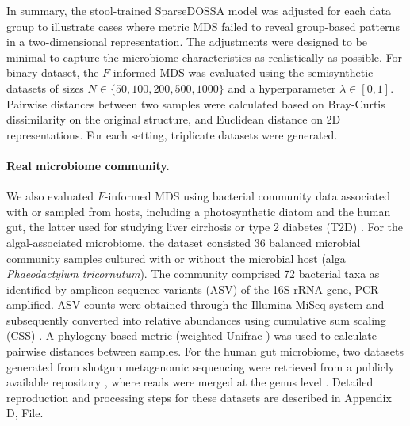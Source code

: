 \documentclass[10pt,letterpaper]{article}
\newcommand{\1}{{\rm 1}\kern-0.24em{\rm I}}
\begin{document}
In summary, the stool-trained SparseDOSSA model was adjusted for each data group to illustrate cases where metric MDS failed to reveal group-based patterns in a two-dimensional representation. The adjustments were designed to be minimal to capture the microbiome characteristics as realistically as possible. For binary dataset, the $F$-informed MDS was evaluated using the semisynthetic datasets of sizes $N\in\{50,100,200,500,1000\}$ and a hyperparameter $\lambda\in[0, 1]$. Pairwise distances between two samples were calculated based on Bray-Curtis dissimilarity on the original structure, and Euclidean distance on 2D representations. For each setting, triplicate datasets were generated.

\paragraph*{Real microbiome community.}
We also evaluated $F$-informed MDS using bacterial community data associated with or sampled from hosts, including a photosynthetic diatom \cite{kim22} and the human gut, the latter used for studying liver cirrhosis \cite{Qin14} or type 2 diabetes (T2D) \cite{Karlsson13, Qin12}. 
For the algal-associated microbiome, the dataset consisted 36 balanced microbial community samples cultured with or without the microbial host (alga \textit{Phaeodactylum tricornutum}). The community comprised 72 bacterial taxa as identified by amplicon sequence variants (ASV) of the 16S rRNA gene, PCR-amplified. ASV counts were obtained through the Illumina MiSeq system and subsequently converted into relative abundances using cumulative sum scaling (CSS) \cite{paulson13}. A phylogeny-based metric (weighted Unifrac \cite{lozupone07}) was used to calculate pairwise distances between samples.
For the human gut microbiome, two datasets generated from shotgun metagenomic sequencing were retrieved from a publicly available repository \cite{Pasolli16}, where reads were merged at the genus level \cite{reiman20}. Detailed reproduction and processing steps for these datasets are described in Appendix D,  File.
\end{document}
